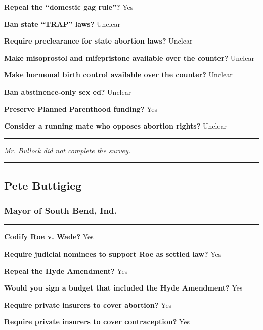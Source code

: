 \textbf{Repeal the ``domestic gag rule''?} Yes

\textbf{Ban state ``TRAP'' laws?} Unclear

\textbf{Require preclearance for state abortion laws?} Unclear

\textbf{Make misoprostol and mifepristone available over the counter?}
Unclear

\textbf{Make hormonal birth control available over the counter?} Unclear

\textbf{Ban abstinence-only sex ed?} Unclear

\textbf{Preserve Planned Parenthood funding?} Yes

\textbf{Consider a running mate who opposes abortion rights?} Unclear

\begin{center}\rule{0.5\linewidth}{\linethickness}\end{center}

\emph{Mr. Bullock did not complete the survey.}

\begin{center}\rule{0.5\linewidth}{\linethickness}\end{center}

\hypertarget{pete-buttigieg}{%
\subsection{Pete Buttigieg}\label{pete-buttigieg}}

\hypertarget{mayor-of-south-bend-ind}{%
\subsubsection{Mayor of South Bend,
Ind.}\label{mayor-of-south-bend-ind}}

\begin{center}\rule{0.5\linewidth}{\linethickness}\end{center}

\textbf{Codify Roe v. Wade?} Yes

\textbf{Require judicial nominees to support Roe as settled law?} Yes

\textbf{Repeal the Hyde Amendment?} Yes

\textbf{Would you sign a budget that included the Hyde Amendment?} Yes

\textbf{Require private insurers to cover abortion?} Yes

\textbf{Require private insurers to cover contraception?} Yes

